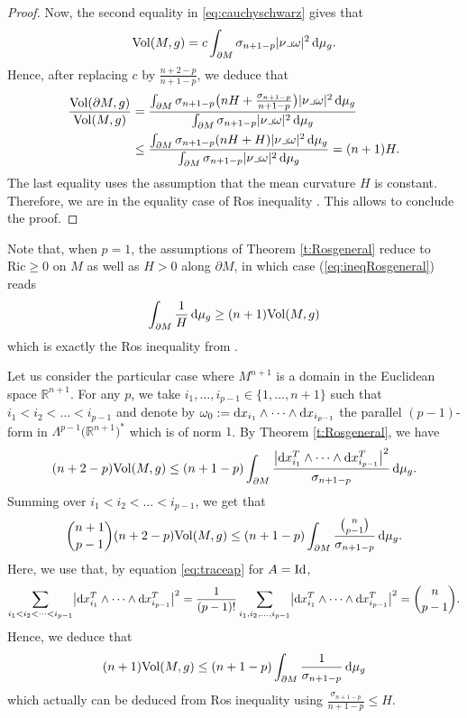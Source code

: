 \documentclass[pdftex]{sigma}
\numberwithin{equation}{section}
\begin{document}
\begin{proof}
Now, the second equality in \eqref{eq:cauchyschwarz} gives that
\[{\rm Vol}(M,g)=c\int_{\partial M}\sigma_{n+1-p}|\nu\lrcorner\omega|^2\,{\rm d}\mu_g.\]
Hence, after replacing $c$ by $\frac{n+2-p}{n+1-p}$, we deduce that
\begin{align*}
\frac{{\rm Vol}(\partial M,g)}{{\rm Vol}(M,g)}&= \frac{\int_{\partial M}\sigma_{n+1-p}\bigl(nH+\frac{\sigma_{n+1-p}}{n+1-p}\bigr)|\nu\lrcorner\omega|^2\,{\rm d}\mu_g}{\int_{\partial M}\sigma_{n+1-p}|\nu\lrcorner\omega|^2\,{\rm d}\mu_g}\\
&\leq  \frac{\int_{\partial M}\sigma_{n+1-p}(nH+H)|\nu\lrcorner\omega|^2\,{\rm d}\mu_g}{\int_{\partial M}\sigma_{n+1-p}|\nu\lrcorner\omega|^2\,{\rm d}\mu_g}
= (n+1) H.
\end{align*}
The last equality uses the assumption that the mean curvature $H$ is constant. Therefore, we are in the equality case of Ros i\-ne\-qua\-li\-ty \cite[Theorem 1]{Ros87}. This allows to conclude the proof.
\end{proof}

Note that, when $p=1$, the assumptions of Theorem \ref{t:Rosgeneral} reduce to $\mathrm{Ric}\geq0$ on $M$ as well as $H>0$ along $\partial M$, in which case (\ref{eq:ineqRosgeneral}) reads
\[\int_{\partial M}\frac{1}{H}\,{\rm d}\mu_g\geq(n+1)\mathrm{Vol}(M,g)\]
which is exactly the Ros i\-ne\-qua\-li\-ty from \cite[Theorem 1]{Ros87}.

\begin{Remark}\rm Let us consider the particular case where $M^{n+1}$ is a domain in the Euclidean space $\mathbb{R}^{n+1}$. For any $p$, we take $i_1,\dots,i_{p-1}\in\{1,\dots,n+1\}$ such that $i_1<i_2<\dots<i_{p-1}$ and denote by $\omega_0:={\rm d}x_{i_1}\wedge\dots\wedge {\rm d}x_{i_{p-1}}$ the parallel $(p-1)$-form in $\Lambda^{p-1}\bigl(\mathbb{R}^{n+1}\bigr)^*$ which is of norm $1$. By Theorem \ref{t:Rosgeneral}, we have
\begin{equation*}
(n+2-p)\mathrm{Vol}(M,g)\leq(n+1-p)\int_{\partial M}\frac{\bigl|{\rm d}x_{i_1}^T\wedge\dots\wedge {\rm d}x_{i_{p-1}}^T\bigr|^2}{\sigma_{n+1-p}}\,{\rm d}\mu_g.
\end{equation*}
Summing over $i_1<i_2<\dots<i_{p-1}$, we get that
\begin{equation*}
\binom{n+1}{p-1}(n+2-p)\mathrm{Vol}(M,g)\leq(n+1-p)\int_{\partial M}\frac{\binom{n}{p-1}}{\sigma_{n+1-p}}\,{\rm d}\mu_g.
\end{equation*}
Here, we use that, by equation \eqref{eq:traceap} for $A={\rm Id}$,
\begin{gather*}
\sum_{i_1<i_2<\dots<i_{p-1}}\bigl|{\rm d}x_{i_1}^T\wedge\dots\wedge {\rm d}x_{i_{p-1}}^T\bigr|^2 = \frac{1}{(p-1)!}\sum_{i_1,i_2,\dots,i_{p-1}}\bigl|{\rm d}x_{i_1}^T\wedge\dots\wedge {\rm d}x_{i_{p-1}}^T\bigr|^2=\binom{n}{p-1}.
\end{gather*}
Hence, we deduce that
\begin{equation*}
(n+1)\mathrm{Vol}(M,g)\leq(n+1-p)\int_{\partial M}\frac{1}{\sigma_{n+1-p}}\,{\rm d}\mu_g
\end{equation*}
which actually can be deduced from Ros i\-ne\-qua\-li\-ty using $\frac{\sigma_{n+1-p}}{n+1-p}\leq H$.
\end{Remark}
\end{document}
